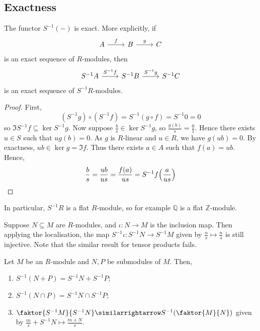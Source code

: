 \subsection{Exactness}
\begin{proposition}
    The functor \( S^{-1}(-) \) is exact.
    More explicitly, if
\[\begin{tikzcd}
	A & B & C
	\arrow["f", from=1-1, to=1-2]
	\arrow["g", from=1-2, to=1-3]
\end{tikzcd}\]
    is an exact sequence of \( R \)-modules, then
\[\begin{tikzcd}
	{S^{-1}A} & {S^{-1}B} & {S^{-1}C}
	\arrow["{S^{-1}f}", from=1-1, to=1-2]
	\arrow["{S^{-1}g}", from=1-2, to=1-3]
\end{tikzcd}\]
    is an exact sequence of \( S^{-1}R \)-modules.
\end{proposition}
\begin{proof}
    First,
    \[ (S^{-1}g) \circ (S^{-1}f) = S^{-1}(g \circ f) = S^{-1}0 = 0 \]
    so \( \Im S^{-1}f \subseteq \ker S^{-1}g \).
    Now suppose \( \frac{b}{s} \in \ker S^{-1}g \), so \( \frac{g(b)}{s} = \frac{0}{1} \).
    Hence there exists \( u \in S \) such that \( ug(b) = 0 \).
    As \( g \) is \( R \)-linear and \( u \in R \), we have \( g(ub) = 0 \).
    By exactness, \( ub \in \ker g = \Im f \).
    Thus there exists \( a \in A \) such that \( f(a) = ub \).
    Hence,
    \[ \frac{b}{s} = \frac{ub}{us} = \frac{f(a)}{us} = S^{-1}f\qty(\frac{a}{us}) \]
\end{proof}
In particular, \( S^{-1}R \) is a flat \( R \)-module, so for example \( \mathbb Q \) is a flat \( \mathbb Z \)-module.
\begin{remark}
    Suppose \( N \subseteq M \) are \( R \)-modules, and \( \iota : N \to M \) is the inclusion map.
    Then applying the localisation, the map \( S^{-1}\iota : S^{-1}N \to S^{-1}M \) given by \( \frac{n}{s} \mapsto \frac{n}{s} \) is still injective.
    Note that the similar result for tensor products fails.
\end{remark}
\begin{proposition}
    Let \( M \) be an \( R \)-module and \( N, P \) be submodules of \( M \).
    Then,
    \begin{enumerate}
        \item \( S^{-1}(N + P) = S^{-1}N + S^{-1}P \);
        \item \( S^{-1}(N \cap P) = S^{-1}N \cap S^{-1}P \);
        \item \( \faktor{S^{-1}M}{S^{-1}N} \similarrightarrow S^{-1}\qty(\faktor{M}{N}) \) given by \( \frac{m}{s} + S^{-1}N \mapsto \frac{m + N}{s} \).
    \end{enumerate}
\end{proposition}
